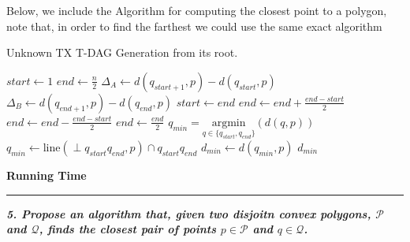 \documentclass[a4paper, 10pt]{article}
\begin{document}

\begin{figure}[h!]
\end{figure}

Below, we include the Algorithm for computing the closest point to a polygon, note that, in order to find the farthest we could use the same exact algorithm
\begin{algorithm}
  \caption{Unknown TX T-DAG Generation from its root. \label{alg:dag-generation}}
  \begin{multicols}{2}
  \begin{algorithmic}[1]
        \State $start \gets 1$
        \State $end \gets \frac{n}{2}$
            \State $\Delta_A \gets d(q_{start + 1}, p) - d(q_{start}, p)$
            \State $\Delta_B \gets d(q_{end + 1}, p) - d(q_{end}, p)$
                \Case{$+ +$}
                \EndCase
                \Case{$+ -$}
                    \State $start \gets end$ 
                    \State $end \gets end + \frac{end - start}{2}$
                \EndCase
                \Case{$- +$}
                    \State $end \gets end - \frac{end - start}{2}$
                \EndCase
                \Case{$- -$}
                    \State $end \gets \frac{end}{2}$
                \EndCase
            \EndSwitch
        \EndWhile
            \State $q_{min} = \underset{q \in \lbrace q_{start}, q_{end}\rbrace}{\text{argmin}}{(d(q, p))}$
        \Else
            \State $q_{min} \gets \text{line}(\perp q_{start}q_{end}, p) \cap q_{start}q_{end}$
        \EndIf
        \State $d_{min} \gets d(q_{min}, p)$
        \State \Return $d_{min}$
  \end{algorithmic}
  \end{multicols}
\end{algorithm}

\textbf{Running Time}

\vspace{10pt}

\begin{center}
    \hrule
\end{center}

\textbf{\textit{5. Propose an algorithm that, given two disjoitn convex polygons, $\mathcal{P}$ and $\mathcal{Q}$, finds the closest pair of points $p \in \mathcal{P}$ and $q \in \mathcal{Q}$.}}
\end{document}
